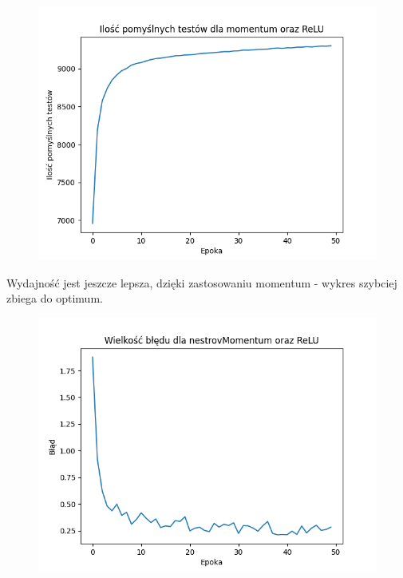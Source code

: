 \documentclass{article}
\begin{document}
\begin{figure}[!htb]
  \centering
  \includegraphics[width=\linewidth]{test_momentum_ReLU.png}
\end{figure}

Wydajność jest jeszcze lepsza, dzięki zastosowaniu momentum - wykres szybciej zbiega do optimum.

\begin{figure}[!htb]
  \centering
  \includegraphics[width=\linewidth]{error_nestrovMomentum_ReLU.png}
\end{figure}
\end{document}
